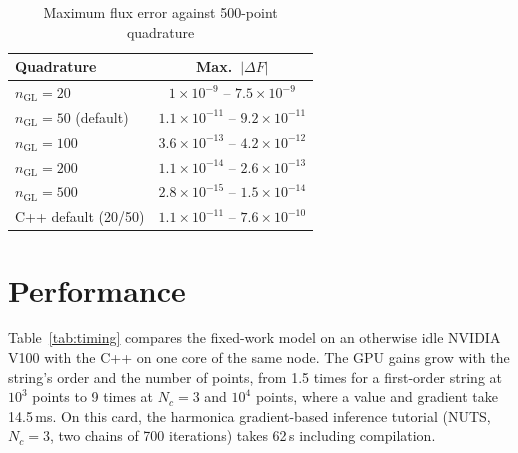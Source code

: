\documentclass[twocolumn]{aastex701}
\begin{document}
\begin{table}[t]
\centering
\caption{Maximum flux error against 500-point quadrature\label{tab:accuracy}}
\begin{tabular}{lc}
\hline\hline
Quadrature & Max.\ $|\Delta F|$ \\
\hline
$n_\mathrm{GL}=20$ & $1\times10^{-9}$ -- $7.5\times10^{-9}$ \\
$n_\mathrm{GL}=50$ (default) & $1.1\times10^{-11}$ -- $9.2\times10^{-11}$ \\
$n_\mathrm{GL}=100$ & $3.6\times10^{-13}$ -- $4.2\times10^{-12}$ \\
$n_\mathrm{GL}=200$ & $1.1\times10^{-14}$ -- $2.6\times10^{-13}$ \\
$n_\mathrm{GL}=500$ & $2.8\times10^{-15}$ -- $1.5\times10^{-14}$ \\
C++ default (20/50) & $1.1\times10^{-11}$ -- $7.6\times10^{-10}$ \\
\hline
\end{tabular}
\end{table}

\section{Performance} \label{sec:performance}

Table~\ref{tab:timing} compares the fixed-work model on an otherwise idle
NVIDIA V100 with the C++ on one core of the same node. The GPU gains
grow with the string's order and the number of points, from 1.5 times
for a first-order string at $10^3$ points to 9 times at $N_c=3$ and
$10^4$ points, where a value and gradient take 14.5\,ms. On this card,
the harmonica gradient-based inference tutorial (NUTS, $N_c=3$, two
chains of 700 iterations) takes 62\,s including compilation.
\end{document}
